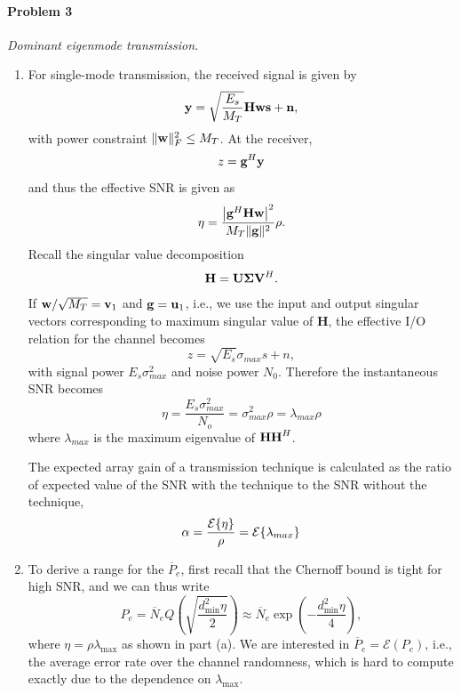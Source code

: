 \documentclass[12pt]{article}
\begin{document}
\paragraph{Problem 3} {\it Dominant eigenmode transmission.} 
\begin{enumerate}
\item
For single-mode transmission, the received signal is given by
\begin{equation*}
{\bf y} = \sqrt{\frac{E_s}{M_T}} {\bf H ws} + {\bf n},
\end{equation*}
with power constraint $\|{\bf w}\|_F^2 \leq M_T$.
At the receiver,
$$
z = {\bf g}^H {\bf y}
$$
and thus the effective SNR is given as
$$
\eta = \frac{ \left \lvert {\bf g}^H {\bf Hw} \right \rvert^2} {M_T \|{\bf g}\|^2}\rho.
$$
Recall the singular value decomposition
\begin{eqnarray*}
{\bf H} = {\bf U \Sigma V}^H.
\end{eqnarray*}
If ${\bf w}/\sqrt{M_T} = {\bf v}_1$ and ${\bf g} = {\bf u}_1$, i.e., we use the input and output singular vectors corresponding to maximum singular value of {\bf H}, the effective I/O relation for the channel becomes
\begin{equation*}
z = \sqrt{E_s} \sigma_{max} s + n,
\end{equation*}
with signal power $E_s \sigma_{max}^2$ and noise power  $N_0$. Therefore the instantaneous SNR becomes
\begin{equation*}
\eta = \frac{E_s \sigma_{max}^2}{N_o} = \sigma_{max}^2 \rho = \lambda_{max} \rho
\end{equation*}
where $\lambda_{max}$ is the maximum eigenvalue of ${\bf HH}^H$.

The expected array gain of a transmission technique is calculated as the ratio of expected value of the SNR with the technique to the SNR without the technique,
\begin{eqnarray*}
\alpha = \frac{{\cal E} \{\eta\}}{\rho} = {\cal E} \{ \lambda_{max} \}
\end{eqnarray*}



\item To derive a range for the ${\overline P_e}$, first recall that the Chernoff bound is tight for high SNR, and we can thus write
$$
P_e 
= \overline N_e Q\left( \sqrt{\frac{d_\text{min}^2 \eta}{2}} \right) 
\approx \overline N_e \exp \left( -\frac{d_\text{min}^2 \eta}{4} \right),
$$
where $\eta = \rho \lambda_\text{max} $ as shown in part (a). We are interested in $\overline P_e = \mathcal E( P_e)$, i.e., the average error rate over the channel randomness,  which is hard to compute exactly due to the dependence on $\lambda_\text{max}$.


\end{enumerate}
\end{document}

